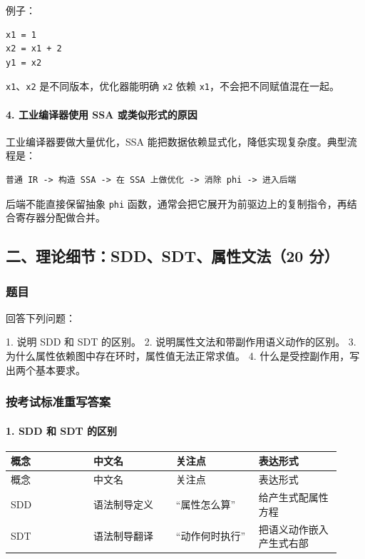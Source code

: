 \documentclass[UTF8]{ctexart}
\begin{document}
例子：

\begin{Verbatim}[fontsize=\small,breaklines=true]
x1 = 1
x2 = x1 + 2
y1 = x2
\end{Verbatim}

\texttt{x1}、\texttt{x2} 是不同版本，优化器能明确 \texttt{x2} 依赖 \texttt{x1}，不会把不同赋值混在一起。

\paragraph*{4. 工业编译器使用 SSA 或类似形式的原因}

工业编译器要做大量优化，SSA 能把数据依赖显式化，降低实现复杂度。典型流程是：

\begin{Verbatim}[fontsize=\small,breaklines=true]
普通 IR -> 构造 SSA -> 在 SSA 上做优化 -> 消除 phi -> 进入后端
\end{Verbatim}

后端不能直接保留抽象 \texttt{phi} 函数，通常会把它展开为前驱边上的复制指令，再结合寄存器分配做合并。

\subsection*{二、理论细节：SDD、SDT、属性文法（20 分）}

\subsubsection*{题目}

回答下列问题：

1. 说明 SDD 和 SDT 的区别。 2. 说明属性文法和带副作用语义动作的区别。 3. 为什么属性依赖图中存在环时，属性值无法正常求值。 4. 什么是受控副作用，写出两个基本要求。

\subsubsection*{按考试标准重写答案}

\paragraph*{1. SDD 和 SDT 的区别}

\begin{longtable}{|p{0.23\linewidth}|p{0.23\linewidth}|p{0.23\linewidth}|p{0.23\linewidth}|}
\hline
概念 & 中文名 & 关注点 & 表达形式 \\
\hline
\endfirsthead
概念 & 中文名 & 关注点 & 表达形式 \\
\hline
\endhead
SDD & 语法制导定义 & “属性怎么算” & 给产生式配属性方程 \\
\hline
SDT & 语法制导翻译 & “动作何时执行” & 把语义动作嵌入产生式右部 \\
\hline
\end{longtable}
\end{document}

